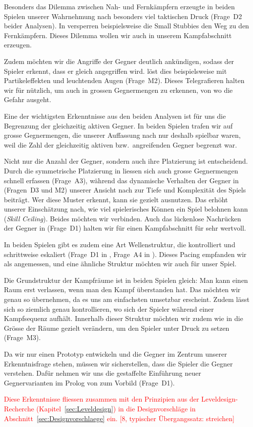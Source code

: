 \documentclass[../Main.tex]{subfiles}
\begin{document}
Besonders das Dilemma zwischen Nah- und Fernkämpfern erzeugte in beiden Spielen unserer Wahrnehmung nach besonders viel taktischen Druck (Frage~D2 beider Analysen). In  versperren beispielsweise die Small Stubbies den Weg zu den Fernkämpfern. Dieses Dilemma wollen wir auch in unserem Kampfabschnitt erzeugen.

Zudem möchten wir die Angriffe der Gegner deutlich ankündigen, sodass der Spieler erkennt, dass er gleich angegriffen wird.  löst dies beispielsweise mit Partikeleffekten und leuchtenden Augen (Frage~M2). Dieses Telegrafieren halten wir für nützlich, um auch in grossen Gegnermengen zu erkennen, von wo die Gefahr ausgeht.

Eine der wichtigsten Erkenntnisse aus den beiden Analysen ist für uns die Begrenzung der gleichzeitig aktiven Gegner. In beiden Spielen trafen wir auf grosse Gegnermengen, die unserer Auffassung nach nur deshalb spielbar waren, weil die Zahl der gleichzeitig aktiven bzw.\ angreifenden Gegner begrenzt war.

Nicht nur die Anzahl der Gegner, sondern auch ihre Platzierung ist entscheidend. Durch die symmetrische Platzierung in  liessen sich auch grosse Gegnermengen schnell erfassen (Frage~A3), während das dynamische Verhalten der Gegner in  (Fragen~D3 und M2) unserer Ansicht nach zur Tiefe und Komplexität des Spiels beiträgt. Wer diese Muster erkennt, kann sie gezielt ausnutzen. Das erhöht unserer Einschätzung nach, wie viel spielerisches Können ein Spiel belohnen kann (\textit{Skill Ceiling}). Beides möchten wir verbinden. Auch das lückenlose Nachrücken der Gegner in  (Frage~D1) halten wir für einen Kampfabschnitt für sehr wertvoll.

In beiden Spielen gibt es zudem eine Art Wellenstruktur, die kontrolliert und schrittweise eskaliert (Frage~D1 in , Frage~A4 in ). Dieses Pacing empfanden wir als angemessen, und eine ähnliche Struktur möchten wir auch für unser Spiel.

Die Grundstruktur der Kampfräume ist in beiden Spielen gleich: Man kann einen Raum erst verlassen, wenn man den Kampf überstanden hat. Das möchten wir genau so übernehmen, da es uns am einfachsten umsetzbar erscheint. Zudem lässt sich so ziemlich genau kontrollieren, wo sich der Spieler während einer Kampfsequenz aufhält. Innerhalb dieser Struktur möchten wir zudem wie in  die Grösse der Räume gezielt verändern, um den Spieler unter Druck zu setzen (Frage~M3).

Da wir nur einen Prototyp entwickeln und die Gegner im Zentrum unserer Erkenntnisfrage stehen, müssen wir sicherstellen, dass die Spieler die Gegner verstehen. Dafür nehmen wir uns die gestaffelte Einführung neuer Gegnervarianten im Prolog von  zum Vorbild (Frage~D1).

\textcolor{red}{Diese Erkenntnisse fliessen zusammen mit den Prinzipien aus der Leveldesign-Recherche (Kapitel~\ref{sec:Leveldesign}) in die Designvorschläge in Abschnitt~\ref{sec:Designvorschlaege} ein. [8, typischer Übergangssatz: streichen]}
\end{document}
